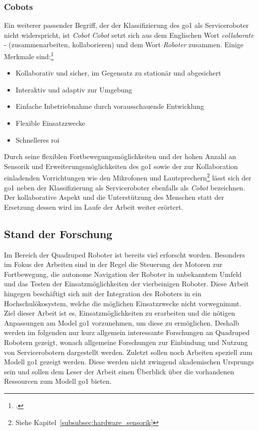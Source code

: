 \subsubsection{Cobots}

Ein weiterer passender Begriff, der der Klassifizierung des \gls{go1} als Serviceroboter nicht widerspricht, ist \emph{Cobot}
\emph{Cobot} setzt sich aus dem Englischen Wort \emph{collaborate} - (zusammenarbeiten, kollaborieren) und dem Wort \emph{Roboter}
zusammen.
Einige Merkmale sind:\footcite{statista_robotics_market}

\begin{itemize}
    \item Kollaborativ und sicher, im Gegensatz zu stationär und abgesichert
    \item Interaktiv und adaptiv zur Umgebung
    \item Einfache Inbetriebnahme durch vorausschauende Entwicklung
    \item Flexible Einsatzzwecke
    \item Schnelleres \gls{roi}
\end{itemize}

Durch seine flexiblen Fortbewegungsmöglichkeiten und der hohen Anzahl an Sensorik und Erweiterungsmöglichkeiten des \gls{go1}
sowie der zur Kollaboration einladenden Vorrichtungen wie den Mikrofonen und Lautsprechern\footnote{Siehe Kapitel~\ref{subsubsec:hardware_sensorik}}
lässt sich der \gls{go1} neben der Klassifizierung als Serviceroboter ebenfalls als \emph{Cobot} bezeichnen.
Der kollaborative Aspekt und die Unterstützung des Menschen statt der Ersetzung dessen wird im Laufe der Arbeit weiter erörtert.

\subsection{Stand der Forschung}
\label{subsec:stand-der-forschung}

Im Bereich der Quadruped Roboter ist bereits viel erforscht worden.
Besonders im Fokus der Arbeiten sind in der Regel die Steuerung der Motoren zur Fortbewegung, die autonome Navigation
der Roboter in unbekanntem Umfeld und das Testen der Einsatzmöglichkeiten der vierbeinigen Roboter.
Diese Arbeit hingegen beschäftigt sich mit der Integration des Roboters in ein Hochschulökosystem, welche die möglichen Einsatzzwecke
nicht vorwegnimmt.
Ziel dieser Arbeit ist es, Einsatzmöglichkeiten zu erarbeiten und die nötigen Anpassungen am Model \gls{go1} vorzunehmen,
um diese zu ermöglichen.
Deshalb werden im folgenden nur kurz allgemein interessante Forschungen an Quadruped Robotern gezeigt, wonach
allgemeine Forschungen zur Einbindung und Nutzung von Servicerobotern dargestellt werden.
Zuletzt sollen noch Arbeiten speziell zum Modell \gls{go1} gezeigt werden.
Diese werden nicht zwingend akademischen Ursprungs sein und sollen dem Leser der Arbeit einen Überblick über die vorhandenen
Ressourcen zum Modell \gls{go1} bieten.

